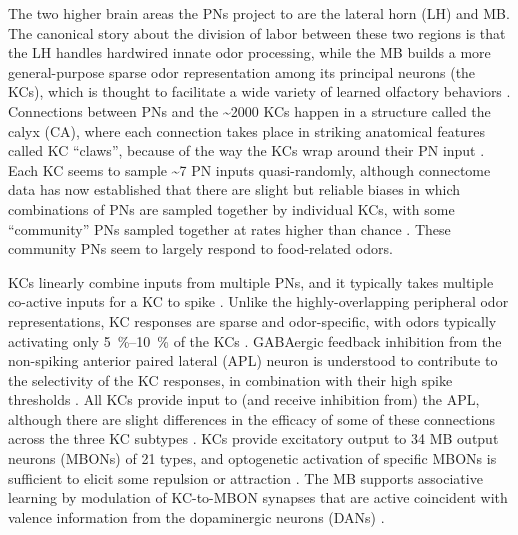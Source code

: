 \documentclass[12pt]{caltech_thesis}
\renewcommand{\cite}{{ }\autocite}
\begin{document}
\begin{refsection}
The two higher brain areas the PNs project to are the lateral horn (LH) and MB.
The canonical story about the division of labor between these two regions is that the LH handles hardwired innate odor processing, while the MB builds a more general-purpose sparse odor representation among its principal neurons (the KCs), which is thought to facilitate a wide variety of learned olfactory behaviors\cite{Heisenberg1985,MBArchToAlgReview,MBLearningBehaviorReview}.
Connections between PNs and the \textasciitilde2000 KCs happen in a structure called the calyx (CA), where each connection takes place in striking anatomical features called KC ``claws'', because of the way the KCs wrap around their PN input\cite{Caron2013}.
Each KC seems to sample \textasciitilde7 PN inputs quasi-randomly, although connectome data has now established that there are slight but reliable biases in which combinations of PNs are sampled together by individual KCs, with some ``community'' PNs sampled together at rates higher than chance\cite{CommunityPNs}.
These community PNs seem to largely respond to food-related odors.

KCs linearly combine inputs from multiple PNs, and it typically takes multiple co-active inputs for a KC to spike\cite{Gruntman2013,Inada2017}.
Unlike the highly-overlapping peripheral odor representations, KC responses are sparse and odor-specific, with odors typically activating only \qtyrange{5}{10}{\percent} of the KCs\cite{Turner1,Turner2}.
GABAergic feedback inhibition from the non-spiking anterior paired lateral (APL) neuron is understood to contribute to the selectivity of the KC responses, in combination with their high spike thresholds\cite{APLNormalization,Lin2014}.
All KCs provide input to (and receive inhibition from) the APL, although there are slight differences in the efficacy of some of these connections across the three KC subtypes\cite{Inada2017}.
KCs provide excitatory output to 34 MB output neurons (MBONs) of 21 types, and optogenetic activation of specific MBONs is sufficient to elicit some repulsion or attraction\cite{Aso2014}.
The MB supports associative learning by modulation of KC-to-MBON synapses that are active coincident with valence information from the dopaminergic neurons (DANs)\cite{Hancock2022}.


\end{refsection}
\end{document}
